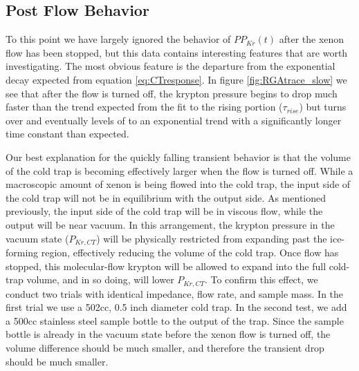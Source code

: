 \subsection{Post Flow Behavior}
To this point we have largely ignored the behavior of $PP_{Kr}(t)$ after the xenon flow has been stopped, but this data contains interesting features that are worth investigating. The most obvious feature is the departure from the exponential decay expected from equation \ref{eq:CTresponse}. In figure \ref{fig:RGAtrace_slow} we see that after the flow is turned off, the krypton pressure begins to drop much faster than the trend expected from the fit to the rising portion ($\tau_{rise}$) but turns over and eventually levels of to an exponential trend with a significantly longer time constant than expected. 

Our best explanation for the quickly falling transient behavior is that the volume of the cold trap is becoming effectively larger when the flow is turned off. While a macroscopic amount of xenon is being flowed into the cold trap, the input side of the cold trap will not be in equilibrium with the output side. As mentioned previously, the input side of the cold trap will be in viscous flow, while the output will be near vacuum. In this arrangement, the krypton pressure in the vacuum state ($P_{Kr,CT}$) will be physically restricted from expanding past the ice-forming region, effectively reducing the volume of the cold trap. Once flow has stopped, this molecular-flow krypton will be allowed to expand into the full cold-trap volume, and in so doing, will lower $P_{Kr,CT}$. To confirm this effect, we conduct two trials with identical impedance, flow rate, and sample mass. In the first trial we use a 502cc, 0.5 inch diameter cold trap. In the second test, we add a 500cc stainless steel sample bottle to the output of the trap. Since the sample bottle is already in the vacuum state before the xenon flow is turned off, the volume difference should be much smaller, and therefore the transient drop should be much smaller. 
